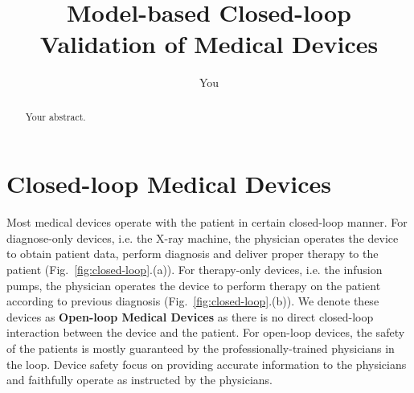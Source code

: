 \documentclass[a4paper]{article}
\title{Model-based Closed-loop Validation of Medical Devices}
\author{You}
\newcommand{\figref}[1]{Fig.~\ref{fig:#1}}
\begin{document}
\maketitle

\begin{abstract}
Your abstract.
\end{abstract}

\section{Closed-loop Medical Devices}
Most medical devices operate with the patient in certain closed-loop manner. For diagnose-only devices, i.e. the X-ray machine, the physician operates the device to obtain patient data, perform diagnosis and deliver proper therapy to the patient (\figref{closed-loop}.(a)). For therapy-only devices, i.e. the infusion pumps, the physician operates the device to perform therapy on the patient according to previous diagnosis (\figref{closed-loop}.(b)). We denote these devices as \textbf{Open-loop Medical Devices} as there is no direct closed-loop interaction between the device and the patient. For open-loop devices, the safety of the patients is mostly guaranteed by the professionally-trained physicians in the loop. Device safety focus on providing accurate information to the physicians and faithfully operate as instructed by the physicians.
\end{document}
